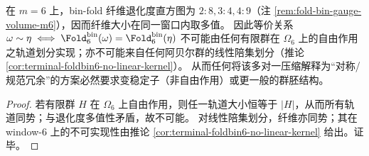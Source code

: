 \begin{corollary}\label{cor:foldbin6-degeneracy-multivalued-nonfree}
在 \(m=6\) 上，bin-fold 纤维退化度直方图为 \(2:8,3:4,4:9\)（注 \ref{rem:fold-bin-gauge-volume-m6}），因而纤维大小在同一窗口内取多值。
因此等价关系
\(
\omega\sim\eta\iff \Fold^{\mathrm{bin}}_6(\omega)=\Fold^{\mathrm{bin}}_6(\eta)
\)
不可能由任何有限群在 \(\Omega_6\) 上的自由作用之轨道划分实现；亦不可能来自任何阿贝尔群的线性陪集划分（推论 \ref{cor:terminal-foldbin6-no-linear-kernel}）。
从而任何将该多对一压缩解释为“对称/规范冗余”的方案必然要求变稳定子（非自由作用）或更一般的群胚结构。
\end{corollary}
\begin{proof}
若有限群 \(H\) 在 \(\Omega_6\) 上自由作用，则任一轨道大小恒等于 \(|H|\)，从而所有轨道同势；与退化度多值性矛盾，故不可能。
对线性陪集划分，纤维亦同势；其在 window-\(6\) 上的不可实现性由推论 \ref{cor:terminal-foldbin6-no-linear-kernel} 给出。证毕。
\end{proof}
